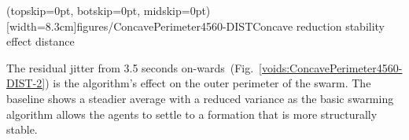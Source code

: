 \documentclass{ieeeaccess}
\begin{document}
\Figure[t!](topskip=0pt, botskip=0pt, midskip=0pt)[width=8.3cm]{figures/ConcavePerimeter4560-DIST}{Concave reduction stability effect distance\label{voids:ConcavePerimeter4560-DIST}}

The residual jitter from 3.5 seconds on-wards~(Fig.~\ref{voids:ConcavePerimeter4560-DIST-2}) is the algorithm's effect on the outer perimeter of the swarm. The baseline shows a steadier average with a reduced variance as the basic swarming algorithm allows the agents to settle to a formation that is more structurally stable.
\end{document}
